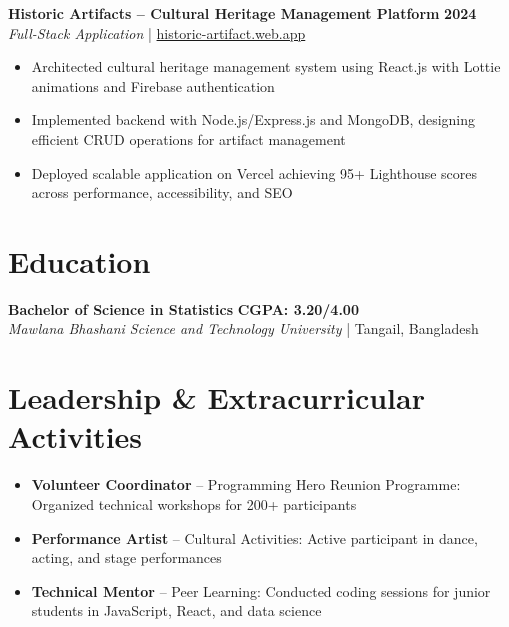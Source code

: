 \documentclass[10pt,a4paper]{article}
\begin{document}
\vspace{1pt}

\textbf{Historic Artifacts -- Cultural Heritage Management Platform} \hfill \textbf{2024}\\
\textit{Full-Stack Application} | \href{https://historic-artifact.web.app}{historic-artifact.web.app}

\begin{itemize}[leftmargin=15pt, itemsep=0.5pt, parsep=0pt]
    \item Architected cultural heritage management system using React.js with Lottie animations and Firebase authentication
    \item Implemented backend with Node.js/Express.js and MongoDB, designing efficient CRUD operations for artifact management
    \item Deployed scalable application on Vercel achieving 95+ Lighthouse scores across performance, accessibility, and SEO
\end{itemize}

\vspace{2pt}

\section{Education}

\textbf{Bachelor of Science in Statistics} \hfill \textbf{CGPA: 3.20/4.00}\\
\textit{Mawlana Bhashani Science and Technology University} | Tangail, Bangladesh

\vspace{2pt}

\section{Leadership \& Extracurricular Activities}

\begin{itemize}[leftmargin=15pt, itemsep=0.5pt, parsep=0pt]
    \item \textbf{Volunteer Coordinator} -- Programming Hero Reunion Programme: Organized technical workshops for 200+ participants
    \item \textbf{Performance Artist} -- Cultural Activities: Active participant in dance, acting, and stage performances
    \item \textbf{Technical Mentor} -- Peer Learning: Conducted coding sessions for junior students in JavaScript, React, and data science
\end{itemize}
\end{document}
